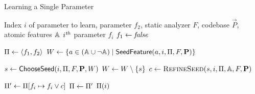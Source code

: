 \begin{algorithm}[t!]
  \caption{Learning a Single Parameter}\label{alg:learning}\small
  \begin{algorithmic}[1]
		\Require Index $i$ of parameter to learn, parameter $f_2$, static analyzer $F$, codebase $\vec{P}$,
		atomic features $\mathbb{A}$
		\Ensure $i^{\it th}$ parameter $f_i$
\State $f_1 \gets {\it false}$


		 \State $\Pi \gets \langle f_1, f_2 \rangle$
                \State $W \gets \{ a \in (\mathbb{A} \cup \neg \mathbb{A}) \mid
\textsf{SeedFeature} (a, i, \Pi, F, \mathbf{P}) \}$ 


		  \State $s \gets {\sf ChooseSeed}(i,\Pi,F,\mathbf{P},W)$
		  \State $W \gets W \setminus \{ s \}$
		  \State $c \gets {\textsc{RefineSeed}}(s, i,\Pi,
                  \mathbb{A}, F, \mathbf{P})$ 


		  \State $\Pi' \gets \Pi[f_i \mapsto f_i \vee c]$ 
  		    \State $\Pi \gets \Pi'$ 
		  \EndIf
		\EndWhile
		\State \Return $\Pi(i)$ 
		\EndProcedure
\end{algorithmic}
\end{algorithm}

